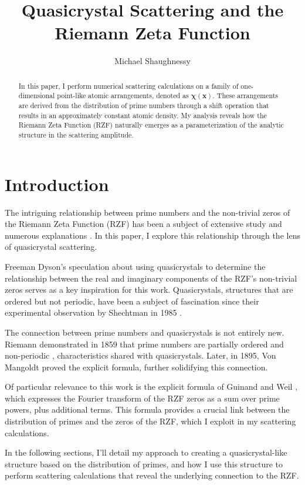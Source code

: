 \documentclass[11pt, oneside]{article}
\title{Quasicrystal Scattering and the Riemann Zeta Function}
\author{Michael Shaughnessy}
\begin{document}
\maketitle

\begin{abstract}
In this paper, I perform numerical scattering calculations on a family of one-dimensional point-like atomic arrangements, denoted as $\mathbf{\chi(x)}$. These arrangements are derived from the distribution of prime numbers through a shift operation that results in an approximately constant atomic density. My analysis reveals how the Riemann Zeta Function (RZF) naturally emerges as a parameterization of the analytic structure in the scattering amplitude.
\end{abstract}

\section{Introduction}

The intriguing relationship between prime numbers and the non-trivial zeros of the Riemann Zeta Function (RZF) has been a subject of extensive study and numerous explanations \cite{Riemann, Selberg, Dyson, Zhang}. In this paper, I explore this relationship through the lens of quasicrystal scattering.

Freeman Dyson's speculation \cite{Baez} about using quasicrystals to determine the relationship between the real and imaginary components of the RZF's non-trivial zeros serves as a key inspiration for this work. Quasicrystals, structures that are ordered but not periodic, have been a subject of fascination since their experimental observation by Shechtman in 1985 \cite{Shechtman1985}.

The connection between prime numbers and quasicrystals is not entirely new. Riemann demonstrated in 1859 that prime numbers are partially ordered and non-periodic \cite{Riemann1859}, characteristics shared with quasicrystals. Later, in 1895, Von Mangoldt \cite{VonMangoldt1895} proved the explicit formula, further solidifying this connection.

Of particular relevance to this work is the explicit formula of Guinand and Weil \cite{Weil}, which expresses the Fourier transform of the RZF zeros as a sum over prime powers, plus additional terms. This formula provides a crucial link between the distribution of primes and the zeros of the RZF, which I exploit in my scattering calculations.

In the following sections, I'll detail my approach to creating a quasicrystal-like structure based on the distribution of primes, and how I use this structure to perform scattering calculations that reveal the underlying connection to the RZF.
\end{document}
